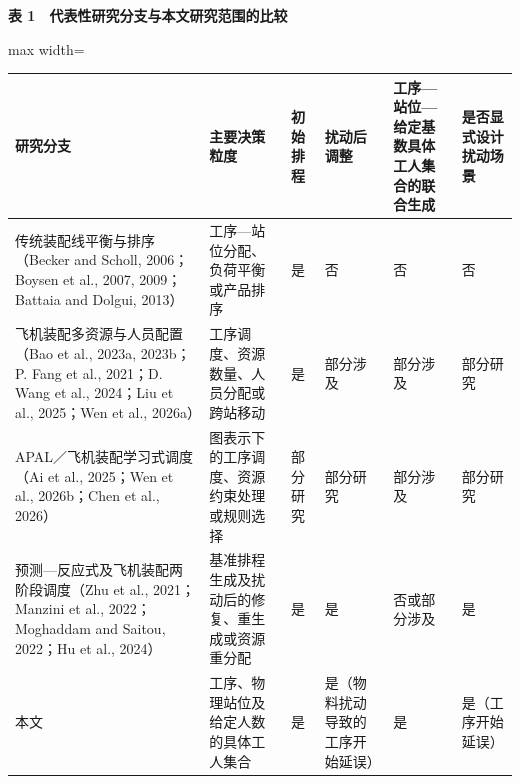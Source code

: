 \documentclass[journal,10pt]{IEEEtran}
\renewcommand{\arraystretch}{1.08}
\begin{document}
\begin{table}[!t]
\centering
\footnotesize
\textbf{表 1　代表性研究分支与本文研究范围的比较}\par\smallskip
\setlength{\tabcolsep}{3pt}
\renewcommand{\arraystretch}{1.08}
\begin{adjustbox}{max width=\textwidth}
\begin{tabular}{@{}
  >{\raggedright\arraybackslash}p{}
  >{\raggedright\arraybackslash}p{}
  >{\centering\arraybackslash}p{}
  >{\centering\arraybackslash}p{}
  >{\centering\arraybackslash}p{}
  >{\centering\arraybackslash}p{}@{}}
\toprule
\begin{minipage}[b]{\linewidth}\raggedright
研究分支
\end{minipage} & \begin{minipage}[b]{\linewidth}\raggedright
主要决策粒度
\end{minipage} & \begin{minipage}[b]{\linewidth}\centering
初始排程
\end{minipage} & \begin{minipage}[b]{\linewidth}\centering
扰动后调整
\end{minipage} & \begin{minipage}[b]{\linewidth}\centering
工序---站位---给定基数具体工人集合的联合生成
\end{minipage} & \begin{minipage}[b]{\linewidth}\centering
是否显式设计扰动场景
\end{minipage} \\
\midrule
传统装配线平衡与排序（Becker and Scholl, 2006；Boysen et al., 2007, 2009；Battaia and Dolgui, 2013） & 工序---站位分配、负荷平衡或产品排序 & 是 & 否 & 否 & 否 \\
飞机装配多资源与人员配置（Bao et al., 2023a, 2023b；P. Fang et al., 2021；D. Wang et al., 2024；Liu et al., 2025；Wen et al., 2026a） & 工序调度、资源数量、人员分配或跨站移动 & 是 & 部分涉及 & 部分涉及 & 部分研究 \\
APAL／飞机装配学习式调度（Ai et al., 2025；Wen et al., 2026b；Chen et al., 2026） & 图表示下的工序调度、资源约束处理或规则选择 & 部分研究 & 部分研究 & 部分涉及 & 部分研究 \\
预测---反应式及飞机装配两阶段调度（Zhu et al., 2021；Manzini et al., 2022；Moghaddam and Saitou, 2022；Hu et al., 2024） & 基准排程生成及扰动后的修复、重生成或资源重分配 & 是 & 是 & 否或部分涉及 & 是 \\
本文 & 工序、物理站位及给定人数的具体工人集合 & 是 & 是（物料扰动导致的工序开始延误） & 是 & 是（工序开始延误） \\
\bottomrule
\end{tabular}
\end{adjustbox}
\end{table}
\end{document}
